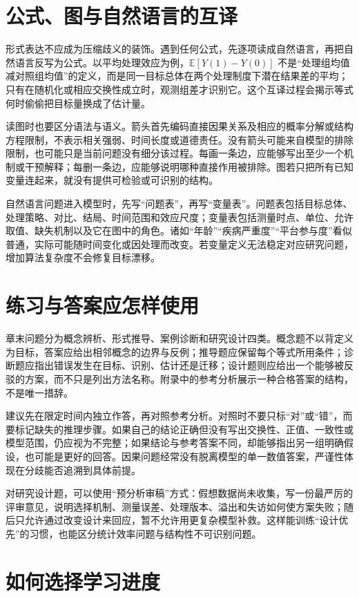 \section*{公式、图与自然语言的互译}

形式表达不应成为压缩歧义的装饰。遇到任何公式，先逐项读成自然语言，再把自然语言反写为公式。以平均处理效应为例，$\mathbb{E}[Y(1)-Y(0)]$ 不是“处理组均值减对照组均值”的定义，而是同一目标总体在两个处理制度下潜在结果差的平均；只有在随机化或相应交换性成立时，观测组差才识别它。这个互译过程会揭示等式何时偷偷把目标量换成了估计量。

读图时也要区分语法与语义。箭头首先编码直接因果关系及相应的概率分解或结构方程限制，不表示相关强弱、时间长度或道德责任。没有箭头可能来自模型的排除限制，也可能只是当前问题没有细分该过程。每画一条边，应能够写出至少一个机制或干预解释；每删一条边，应能够说明哪种直接作用被排除。图若只把所有已知变量连起来，就没有提供可检验或可识别的结构。

自然语言问题进入模型时，先写“问题表”，再写“变量表”。问题表包括目标总体、处理策略、对比、结局、时间范围和效应尺度；变量表包括测量时点、单位、允许取值、缺失机制以及它在图中的角色。诸如“年龄”“疾病严重度”“平台参与度”看似普通，实际可能随时间变化或因处理而改变。若变量定义无法稳定对应研究问题，增加算法复杂度不会修复目标漂移。

\section*{练习与答案应怎样使用}

章末问题分为概念辨析、形式推导、案例诊断和研究设计四类。概念题不以背定义为目标，答案应给出相邻概念的边界与反例；推导题应保留每个等式所用条件；诊断题应指出错误发生在目标、识别、估计还是迁移；设计题则应给出一个能够被反驳的方案，而不只是列出方法名称。附录中的参考分析展示一种合格答案的结构，不是唯一措辞。

建议先在限定时间内独立作答，再对照参考分析。对照时不要只标“对”或“错”，而要标记缺失的推理步骤。如果自己的结论正确但没有写出交换性、正值、一致性或模型范围，仍应视为不完整；如果结论与参考答案不同，却能够指出另一组明确假设，也可能是更好的回答。因果问题经常没有脱离模型的单一数值答案，严谨性体现在分歧能否追溯到具体前提。

对研究设计题，可以使用“预分析审稿”方式：假想数据尚未收集，写一份最严厉的评审意见，说明选择机制、测量误差、处理版本、溢出和失访如何使方案失败；随后只允许通过改变设计来回应，暂不允许用更复杂模型补救。这样能训练“设计优先”的习惯，也能区分统计效率问题与结构性不可识别问题。

\section*{如何选择学习进度}

